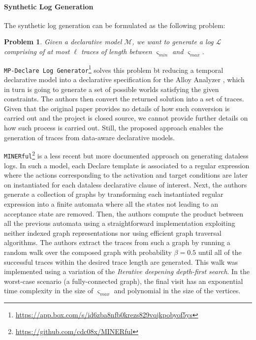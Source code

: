 \documentclass[sigconf]{acmart}
\newtheorem{problem}{Problem}
\newcommand{\smin}{\ensuremath{\varsigma_\textit{min}}}
\newcommand{\smax}{\ensuremath{\varsigma_\textit{max}}}
\begin{document}
\paragraph*{Synthetic Log Generation} The synthetic log generation can be formulated as the following problem: 

\begin{problem}\label{problem}
Given a declarative model $\mathcal{M}$, we want to generate a log $\mathcal{L}$ comprising of at most $\ell$ traces of length between $\smin$ and $\smax$.
\end{problem}

\texttt{MP-Declare Log Generator}\footnote{\url{https://app.box.com/s/id6zba8nfb0krezs829vqjkpobyof5ys}} \cite{DBLP:conf/bpm/SkydanienkoFGM18} solves this problem bt reducing a temporal declarative model into a declarative specification for the Alloy Analyzer \cite{DBLP:books/daglib/0024034}, which in turn is going to generate a set of possible worlds satisfying the given constraints. The authors then convert the returned solution into a set of traces. Given that  the original paper provides no details of how such conversion is carried out and the project is closed source, we cannot provide further details on how such process is carried out. Still, the proposed approach enables the generation of traces from data-aware declarative models.

\texttt{MINERful}\footnote{\url{https://github.com/cdc08x/MINERful}} \cite{DBLP:conf/caise/CiccioBCM15} is a less recent but more documented approach on generating dataless logs. In such a model, each Declare template is associated to a regular expression where the actions corresponding to the activation and target conditions are later on instantiated for each dataless declarative clause of interest. Next, the authors generate a collection of graphs by transforming each  instantiated regular expression into a finite automata where all the states not leading to an acceptance state are removed. Then, the authors compute the product between all the previous automata using a straightforward implementation  exploiting neither indexed graph representations nor using efficient graph traversal algorithms. The authors extract the traces from such a graph by running a random walk over the composed graph with probability  $\beta=0.5$ until all of the successful traces within the desired trace length are  generated. This walk was implemented using a variation of the \textit{Iterative deepening depth-first search}. In the worst-case scenario (a fully-connected graph), the final visit has an exponential time complexity in the size of $\varsigma_\textit{max}$ and polynomial in the size of the vertices.
\end{document}
